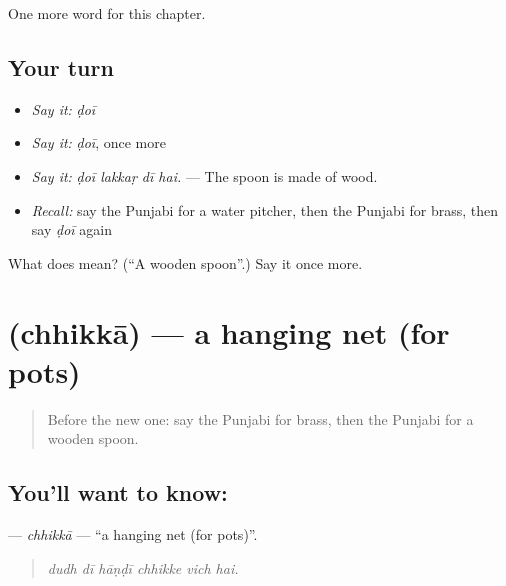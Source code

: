 \begin{grammarlens}[title={What you've built}]
One more word for this chapter.
\end{grammarlens}

\subsection*{Your turn}
\begin{itemize}
\raggedright
  \item \emph{Say it:} \emph{ḍoī}
  \item \emph{Say it:} \emph{ḍoī}, once more
  \item \emph{Say it:} \emph{ḍoī lakkaṛ dī hai.} — The spoon is made of wood.
  \item \emph{Recall:} say the Punjabi for a water pitcher, then the Punjabi for brass, then say \emph{ḍoī} again
\end{itemize}

\begin{tcolorbox}[breakable,colback=teal!4,colframe=teal!35!black,title={Before you move on}]
What does  mean? (\textquotedblleft{}A wooden spoon\textquotedblright{}.) Say it once more.
\end{tcolorbox}
\section[\texorpdfstring{\pa{ਛਿੱਕਾ} (chhikkā)}{ਛਿੱਕਾ (chhikkā)}]{ (chhikkā) — a hanging net (for pots)}

\label{lesson:PA-C251-chhikka}



\begin{quote}
Before the new one: say the Punjabi for brass, then the Punjabi for a wooden spoon.
\end{quote}

\subsection*{You'll want to know: }
\textbf{} — \emph{chhikkā} — \textquotedblleft{}a hanging net (for pots)\textquotedblright{}.

\begin{quote}
     
\end{quote}

\begin{quote}
\emph{dudh dī hāṇḍī chhikke vich hai.}
\end{quote}

